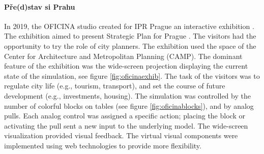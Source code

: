 \paragraph{Pře(d)stav si Prahu} 
In 2019, the OFICINA studio created for IPR Prague an interactive exhibition \cite{oficinaPredstav}. The exhibition aimed to present Strategic Plan for Prague \cite{pragueStrategicPlan}. The visitors had the opportunity to try the role of city planners. The exhibition used the space of the Center for Architecture and Metropolitan Planning (CAMP). The dominant feature of the exhibition was the wide-screen projection displaying the current state of the simulation, see figure \ref{fig:oficinaexhib}. The task of the visitors was to regulate city life (e.g., tourism, transport), and set the course of future development (e.g., investments, housing). The simulation was controlled by the number of colorful blocks on tables (see figure \ref{fig:oficinablocks}), and by analog pulls. Each analog control was assigned a specific action; placing the block or activating the pull sent a new input to the underlying model. The wide-screen visualization provided visual feedback. The virtual visual components were implemented using web technologies to provide more flexibility.

